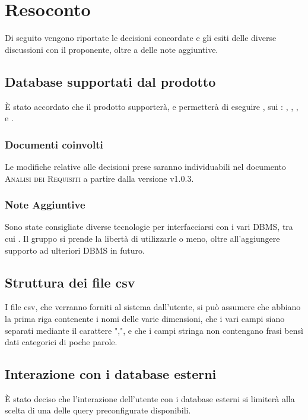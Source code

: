 \documentclass{article}
\begin{document}
\section{Resoconto}
\label{sec:resoconto}

Di seguito vengono riportate le decisioni concordate e gli esiti delle diverse discussioni con il proponente, oltre a 
delle note aggiuntive.

\subsection{Database supportati dal prodotto}
\label{itm:1}

\`{E} stato accordato che il prodotto supporter\`{a}, e permetter\`{a} di eseguire , sui : 
, ,  ,  e .

\subsubsection*{Documenti coinvolti}
Le modifiche relative alle decisioni prese saranno individuabili nel documento \textsc{Analisi dei Requisiti} a partire 
dalla versione v1.0.3.

\subsubsection*{Note Aggiuntive}
Sono state consigliate diverse tecnologie per interfacciarsi con i vari DBMS, tra cui . Il gruppo
si prende la libert\`{a} di utilizzarle o meno, oltre all'aggiungere supporto ad ulteriori DBMS in futuro.

\subsection{Struttura dei file csv}
\label{itm:2}

I file csv, che verranno forniti al sistema dall'utente, si pu\`{o} assumere che abbiano la prima riga contenente i nomi 
delle varie dimensioni, che i vari campi siano separati mediante il carattere ",", e che i campi stringa non contengano 
frasi bens\`{i} dati categorici di poche parole.

\subsection{Interazione con i database esterni}
\label{itm:3}
\`{E} stato deciso che l'interazione dell'utente con i database esterni si limiter\`{a} alla scelta di una delle query 
preconfigurate disponibili.
\end{document}
